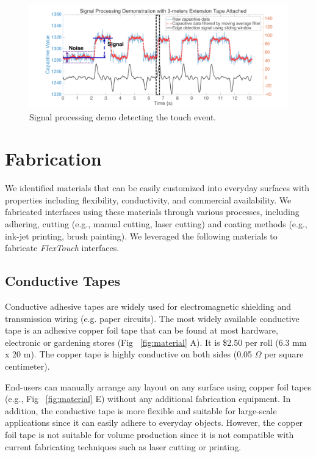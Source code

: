 \begin{figure}[ht]
    \centering
      \includegraphics[width=0.75\columnwidth]{figures/processing.png}
      \setlength{\belowcaptionskip}{-8pt}
      \caption{Signal processing demo  detecting the touch event.}
      \label{fig:processing}
\end{figure}


\section{Fabrication}
We identified materials that can be easily customized into everyday surfaces with properties including flexibility, conductivity, and commercial availability. We fabricated interfaces using these materials through various processes, including adhering, cutting (e.g., manual cutting, laser cutting) and coating methods (e.g., ink-jet printing, brush painting). We leveraged the following materials to fabricate \textit{FlexTouch} interfaces.

\subsection{Conductive Tapes}
Conductive adhesive tapes are widely used for electromagnetic shielding and transmission wiring (e.g. paper circuits). The most widely available conductive tape is an adhesive copper foil tape that can be found at most hardware, electronic or gardening stores (Fig ~\ref{fig:material} A). It is \$2.50 per roll (6.3 mm x 20 m). The copper tape is highly conductive on both sides (0.05 $\Omega$ per square centimeter). 

End-users can manually arrange any layout on any surface using copper foil tapes (e.g., Fig ~\ref{fig:material} E) without any additional fabrication equipment. In addition, the conductive tape is more flexible and suitable for large-scale applications since it can easily adhere to everyday objects. However, the copper foil tape is not suitable for volume production since it is not compatible with current fabricating techniques such as laser cutting or printing. 

